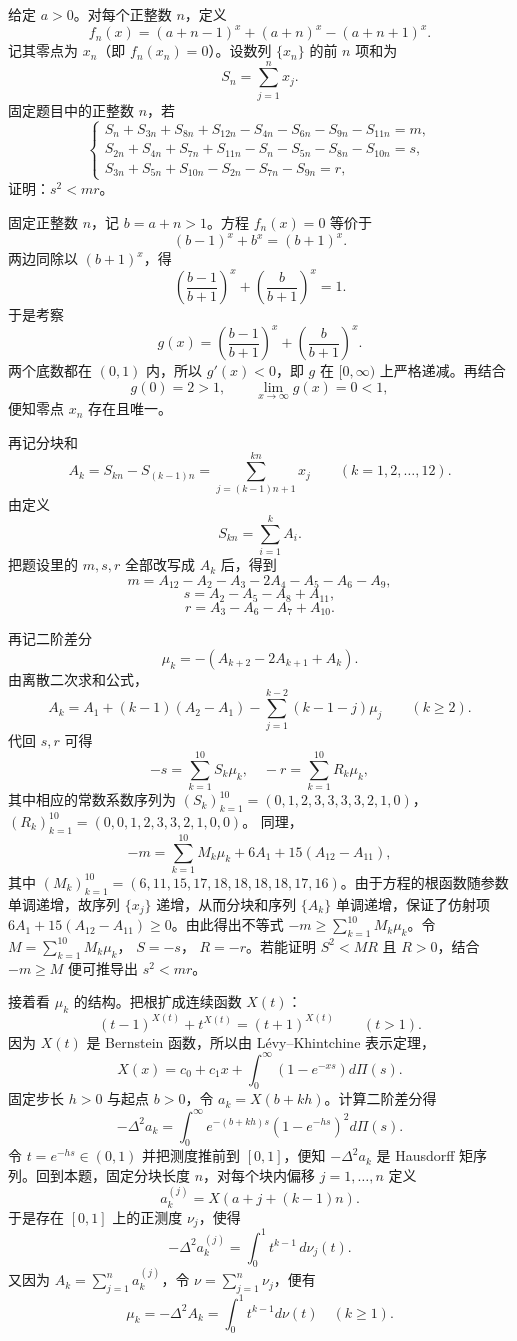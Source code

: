 \begin{example}
给定 $a > 0$。对每个正整数 $n$，定义
$$f_n(x) = (a + n - 1)^x + (a + n)^x - (a + n + 1)^x.$$
记其零点为 $x_n$（即 $f_n(x_n) = 0$）。设数列 $\{x_n\}$ 的前 $n$ 项和为
$$
S_n = \sum_{j=1}^n x_j.$$
固定题目中的正整数 $n$，若
$$\begin{cases}
S_n + S_{3n} + S_{8n} + S_{12n} - S_{4n} - S_{6n} - S_{9n} - S_{11n} = m, \\
S_{2n} + S_{4n} + S_{7n} + S_{11n} - S_n - S_{5n} - S_{8n} - S_{10n} = s, \\
S_{3n} + S_{5n} + S_{10n} - S_{2n} - S_{7n} - S_{9n} = r,
\end{cases}$$
证明：$s^2 < mr$。
\end{example}
\begin{solution}
固定正整数 $n$，记 $b=a+n>1$。方程 $f_n(x)=0$ 等价于
\[
(b-1)^x+b^x=(b+1)^x.
\]
两边同除以 $(b+1)^x$，得
\[
\left(\frac{b-1}{b+1}\right)^x+\left(\frac{b}{b+1}\right)^x=1.
\]
于是考察
\[
g(x)=\left(\frac{b-1}{b+1}\right)^x+\left(\frac{b}{b+1}\right)^x.
\]
两个底数都在 \((0,1)\) 内，所以 \(g'(x)<0\)，即 \(g\) 在 \([0,\infty)\) 上严格递减。再结合
\[
g(0)=2>1,\qquad \lim_{x\to\infty}g(x)=0<1,
\]
便知零点 \(x_n\) 存在且唯一。
 
再记分块和
\[
A_k = S_{kn} - S_{(k-1)n} = \sum_{j=(k-1)n+1}^{kn} x_j\qquad (k=1,2,\dots,12).
\]
由定义
\[
S_{kn} = \sum_{i=1}^k A_i.
\]
把题设里的 \(m,s,r\) 全部改写成 \(A_k\) 后，得到
$$m=A_{12}-A_{2}-A_{3}-2A_{4}-A_{5}-A_{6}-A_{9},$$
$$s=A_{2}-A_{5}-A_{8}+A_{11},$$
$$r=A_{3}-A_{6}-A_{7}+A_{10}.$$
 
再记二阶差分
\[
\mu_k = -(A_{k+2}-2A_{k+1}+A_k).
\]
由离散二次求和公式，
\[
A_k = A_1 + (k-1)(A_2-A_1) - \sum_{j=1}^{k-2}(k-1-j)\mu_j\qquad (k \ge 2).
\]
代回 \(s,r\) 可得
$$-s=\sum_{k=1}^{10}S_{k}\mu_{k}, \quad -r=\sum_{k=1}^{10}R_{k}\mu_{k},$$
其中相应的常数系数序列为 $(S_{k})_{k=1}^{10}=(0,1,2,3,3,3,3,2,1,0)$， $(R_{k})_{k=1}^{10}=(0,0,1,2,3,3,2,1,0,0)$。
同理，
$$-m = \sum_{k=1}^{10}M_{k}\mu_{k} + 6A_1 + 15(A_{12}-A_{11}),$$
其中 $(M_{k})_{k=1}^{10}=(6,11,15,17,18,18,18,18,17,16)$。由于方程的根函数随参数单调递增，故序列 $\{x_j\}$ 递增，从而分块和序列 $\{A_k\}$ 单调递增，保证了仿射项 $6A_1+15(A_{12}-A_{11}) \ge 0$。由此得出不等式 $-m \ge \sum_{k=1}^{10}M_{k}\mu_{k}$。令 $M = \sum_{k=1}^{10}M_{k}\mu_{k}$， $S = -s$， $R = -r$。若能证明 $S^2 < MR$ 且 $R>0$，结合 $-m \ge M$ 便可推导出 $s^2 < mr$。
 
接着看 \(\mu_k\) 的结构。把根扩成连续函数 \(X(t)\)：
\[
(t-1)^{X(t)}+t^{X(t)}=(t+1)^{X(t)}\qquad (t>1).
\]
因为 \(X(t)\) 是 Bernstein 函数，所以由 Lévy--Khintchine 表示定理，
$$X(x)=c_{0}+c_{1}x+\int_{0}^{\infty}(1-e^{-xs})d\Pi(s).$$
固定步长 \(h>0\) 与起点 \(b>0\)，令 \(a_k = X(b+kh)\)。计算二阶差分得
$$-\Delta^{2}a_{k}=\int_{0}^{\infty}e^{-(b+kh)s}(1-e^{-hs})^{2}d\Pi(s).$$
令 \(t=e^{-hs}\in(0,1)\) 并把测度推前到 \([0,1]\)，便知 \(-\Delta^2 a_k\) 是 Hausdorff 矩序列。回到本题，固定分块长度 \(n\)，对每个块内偏移 \(j=1,\dots,n\) 定义
\[
a_k^{(j)} = X(a+j+(k-1)n).
\]
于是存在 \([0,1]\) 上的正测度 \(\nu_j\)，使得
\[
-\Delta^2 a_k^{(j)} = \int_0^1 t^{k-1}\, d\nu_j(t).
\]
又因为 \(A_k = \sum_{j=1}^n a_k^{(j)}\)，令 \(\nu = \sum_{j=1}^n \nu_j\)，便有
$$\mu_{k}=-\Delta^{2}A_{k}=\int_{0}^{1}t^{k-1}d\nu(t) \quad (k \ge 1).$$
 

\end{solution}
